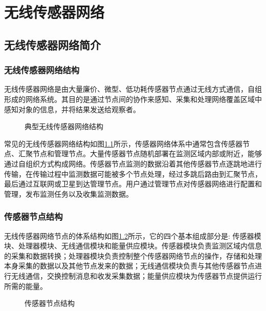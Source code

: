 \chapter{无线传感器网络}\label{introduction}
\section{无线传感器网络简介}
\subsection{无线传感器网络结构}
无线传感器网络是由大量廉价、微型、低功耗传感器节点通过无线方式通信，自组形成的网络系统。其目的是通过节点间的协作来感知、采集和处理网络覆盖区域中感知对象的信息，并将结果发送给观察者。

\begin{figure}[ht]
\centering

\caption{典型无线传感器网络结构}\label{wsn-scenario}
\end{figure}
常见的无线传感器网络结构如图\ref{wsn-scenario}所示，传感器网络体系中通常包含传感器节点、汇聚节点和管理节点。大量传感器节点随机部署在监测区域内部或附近，能够通过自组织方式构成网络。传感器节点监测的数据沿着其他传感器节点逐跳地进行传输，在传输过程中监测数据可能被多个节点处理，经过多跳后路由到汇聚节点，最后通过互联网或卫星到达管理节点。用户通过管理节点对传感器网络进行配置和管理，发布监测任务以及收集监测数据。

\subsection{传感器节点结构}
无线传感器网络节点的体系结构如图\ref{sense-node}所示，它的四个基本组成部分是:
传感器模块、处理器模块、无线通信模块和能量供应模块。传感器模块负责监测区域内信息的采集和数据转换；处理器模块负责控制整个传感器网络节点的操作，存储和处理本身采集的数据以及其他节点发来的数据；无线通信模块负责与其他传感器节点进行无线通信，交换控制消息和收发采集数据；能量供应模块为传感器节点提供运行所需的能量。

\begin{figure}[ht]
\centering

\caption{传感器节点结构}\label{sense-node}
\end{figure}

